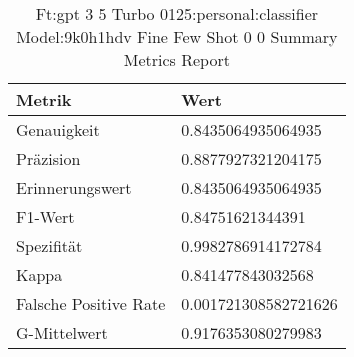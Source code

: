 
    \begin{table}[!ht]
        \centering
        \begin{tabularx}{\textwidth}{X l}
\toprule
\textbf{Metrik} & \textbf{Wert} \\
\midrule
Genauigkeit & \num{0.8435064935064935} \\
Präzision & \num{0.8877927321204175} \\
Erinnerungswert & \num{0.8435064935064935} \\
F1-Wert & \num{0.84751621344391} \\
Spezifität & \num{0.9982786914172784} \\
Kappa & \num{0.841477843032568} \\
Falsche Positive Rate & \num{0.001721308582721626} \\
G-Mittelwert & \num{0.9176353080279983} \\
\bottomrule
\end{tabularx}

        \caption{Ft:gpt 3 5 Turbo 0125:personal:classifier Model:9k0h1hdv Fine Few Shot 0 0 Summary Metrics Report}
        \label{tab:ft:gpt-3-5-turbo-0125:personal:classifier-model:9k0H1hdV-fine-few-shot-0-0-summary-metrics-report}
    \end{table}
    